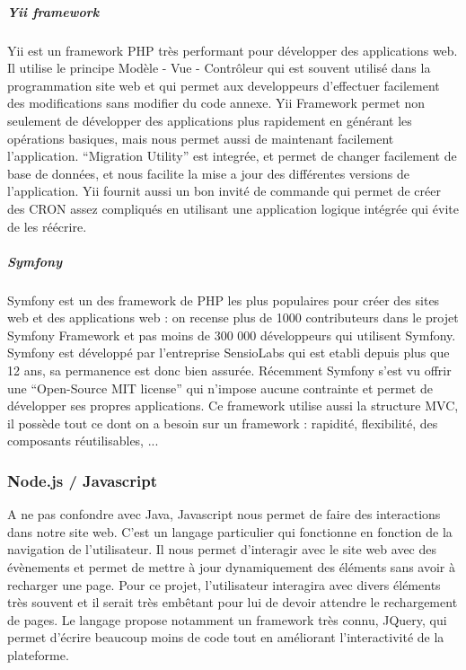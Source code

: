             \subparagraph{Yii framework}
            \label{subpar:yii}
            Yii est un framework PHP très performant pour développer des applications web. Il utilise
            le principe Modèle - Vue - Contrôleur qui est souvent utilisé dans la programmation site web
            et qui permet aux developpeurs d’effectuer facilement des modifications sans modifier du code annexe.
            Yii Framework permet non seulement de développer des applications plus rapidement en générant
            les opérations basiques, mais nous permet aussi de maintenant facilement l’application. “Migration Utility”
            est integrée, et permet de changer facilement de base de données, et nous facilite la mise a jour
            des différentes versions de l’application. Yii fournit aussi un bon invité de commande qui permet
            de créer des CRON assez compliqués en utilisant une application logique intégrée qui évite de les réécrire.

            \subparagraph{Symfony}
            \label{subpar:symfony}
            Symfony est un des framework de PHP les plus populaires pour créer des sites web et des applications web :
            on recense plus de 1000 contributeurs dans le projet Symfony Framework et pas moins de 300 000 développeurs
            qui utilisent Symfony. Symfony est développé par l'entreprise SensioLabs qui est etabli depuis plus que 12 ans,
            sa permanence est donc bien assurée. Récemment Symfony s’est vu offrir une “Open-Source MIT license”
            qui n'impose aucune contrainte et permet de développer ses propres applications. Ce framework utilise aussi
            la structure MVC, il possède tout ce dont on a besoin sur un framework : rapidité, flexibilité, des composants réutilisables, ...

        \subsubsection{Node.js / Javascript}
        \label{subsubsec:node}
        A ne pas confondre avec Java, Javascript nous permet de faire des
        interactions dans notre site web. C’est un langage particulier qui fonctionne en fonction de la
        navigation de l’utilisateur. Il nous permet d’interagir avec le site web avec des évènements et permet
        de mettre à jour dynamiquement des éléments sans avoir à recharger une page. Pour ce projet,
        l’utilisateur interagira avec divers éléments très souvent et il serait très embêtant pour lui de devoir
        attendre le rechargement de pages. Le langage propose notamment un framework très connu,
        JQuery, qui permet d’écrire beaucoup moins de code tout en améliorant l’interactivité de la
        plateforme.

